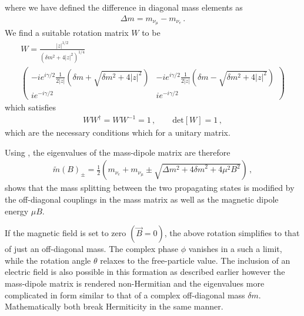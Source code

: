 where we have defined the difference in diagonal mass elements as
\begin{align}
    \Delta m = m_{\nu_{\mu}} - m_{\nu_{e}}\,.
\end{align}
We find a suitable rotation matrix $W$ to be
\begin{multline}
    \label{w:1}
    W=\frac{|z|^{1/2}}{\left(\delta m^{2} + 4|z|^{2}\right)^{1/4}}\\
    \begin{pmatrix}
        -ie^{i\gamma/2}\frac{1}{2|z|}\left(\delta m + \sqrt{\delta m^{2} + 4|z|^{2}}\right) & -ie^{i\gamma/2}\frac{1}{2|z|}\left(\delta m - \sqrt{\delta m^{2} + 4|z|^{2}}\right)\\
        ie^{-i\gamma/2} & ie^{-i\gamma/2}        
    \end{pmatrix}
\end{multline}
which satisfies
\begin{align}
    WW^{\dag}=WW^{-1}=1\,,\qquad \mathrm{det}[W]=1\,,
\end{align}
which are the necessary conditions which for a unitary matrix.

Using , the eigenvalues of the mass-dipole matrix are therefore
\begin{align}
    \label{eigenvalue:1}
    \widetilde{m}(B)_{\pm}=\frac{1}{2}\left(m_{\nu_{e}}+m_{\nu_{\mu}}\pm\sqrt{\Delta m^{2}+4{\delta m}^{2}+4\mu^{2}B^{2}}\right)\,,
\end{align}
 shows that the mass splitting between the two propagating states is modified by the off-diagonal couplings in the mass matrix as well as the magnetic dipole energy $\mu B$.

If the magnetic field is set to zero $(\vec{B}=0)$, the above rotation simplifies to that of just an off-diagonal mass. The complex phase $\phi$ vanishes in a such a limit, while the rotation angle $\theta$ relaxes to the free-particle value. The inclusion of an electric field is also possible in this formation as described earlier however the mass-dipole matrix is rendered non-Hermitian and the eigenvalues more complicated in form similar to that of a complex off-diagonal mass ${\delta m}$. Mathematically both break Hermiticity in the same manner.






